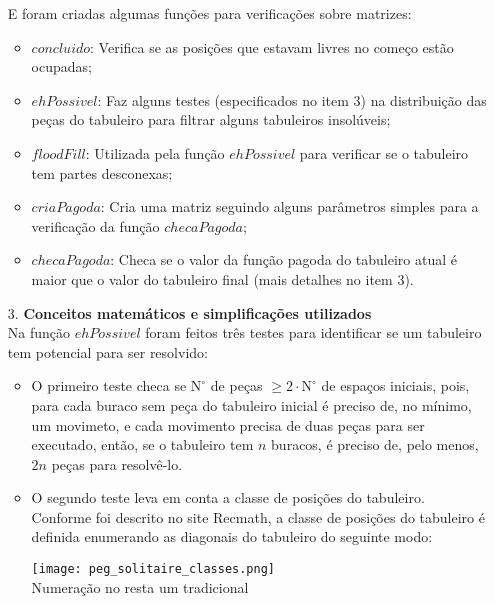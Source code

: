 \documentclass[12pt, a4paper]{article} %
\begin{document}
\begin{enumerate}
\begin{itemize}
\end{itemize}
E foram criadas algumas funções para verificações sobre matrizes:
\begin{itemize}
\item $concluido$: Verifica se as posições que estavam livres no começo estão ocupadas;
\item $ehPossivel$: Faz alguns testes (especificados no item 3) na distribuição das peças do tabuleiro para filtrar alguns tabuleiros insolúveis;
\item $floodFill$: Utilizada pela função $ehPossivel$ para verificar se o tabuleiro tem partes desconexas;
\item $criaPagoda$: Cria uma matriz seguindo alguns parâmetros simples para a verificação da função $checaPagoda$;
\item $checaPagoda$: Checa se o valor da função pagoda do tabuleiro atual é maior que o valor do tabuleiro final (mais detalhes no item 3).
\end{itemize}
\large
\item[3.]\textbf{Conceitos matemáticos e simplificações utilizados}
\normalsize\\[0.5cm]
Na função $ehPossivel$ foram feitos três testes para identificar se um tabuleiro tem potencial para ser resolvido:
\begin{itemize}
\item O primeiro teste checa se $\text{N}^\circ$ de peças $\geqslant 2\cdot \text{N}^\circ$ de espaços iniciais, pois, para cada buraco sem peça do tabuleiro inicial é preciso de, no mínimo, um movimeto, e cada movimento precisa de duas peças para ser executado, então, se o tabuleiro tem $n$ buracos, é preciso de, pelo menos, $2n$ peças para resolvê-lo.
\item O segundo teste leva em conta a classe de posições do tabuleiro. Conforme foi descrito no site Recmath\cite{recmath}, a classe de posições do tabuleiro é definida enumerando as diagonais do tabuleiro do seguinte modo:\\
\small
\begin{center}
\texttt{[image: peg\_solitaire\_classes.png]}\\
Numeração no resta um tradicional\cite{recmath}\\
\end{center}
\normalsize

\end{itemize}
\end{enumerate}
\end{document}

